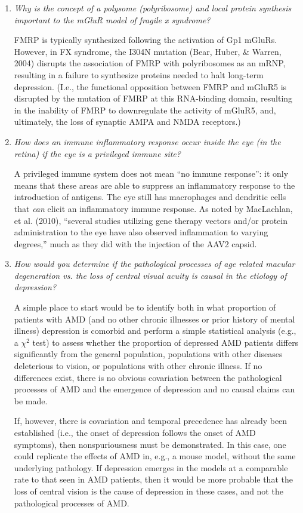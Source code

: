 \documentclass[11pt,final] {article}
\begin{document}
\begin{enumerate}
	\item \textit{Why is the concept of a polysome (polyribosome) and local protein synthesis important to the mGluR model of fragile x syndrome?}
	
	FMRP is typically synthesized following the activation of Gp1 mGluRs. However, in FX syndrome, the I304N mutation (Bear, Huber, \& Warren, 2004) disrupts the association of FMRP with polyribosomes as an mRNP, resulting in a failure to synthesize proteins needed to halt long-term depression. (I.e., the functional opposition between FMRP and mGluR5 is disrupted by the mutation of FMRP at this RNA-binding domain, resulting in the inability of FMRP to downregulate the activity of mGluR5, and, ultimately, the loss of synaptic AMPA and NMDA receptors.)

	\item \textit{How does an immune inflammatory response occur inside the eye (in the retina) if the eye is a privileged immune site?}
	
	A privileged immune system does not mean ``no immune response'': it only means that these areas are able to suppress an inflammatory response to the introduction of antigens. The eye still has macrophages and dendritic cells that \textit{can} elicit an inflammatory immune response. As noted by MacLachlan, et al. (2010), ``several studies utilizing gene therapy vectors and/or protein administration to the eye have also observed inflammation to varying degrees,'' much as they did with the injection of the AAV2 capsid.

	\item \textit{How would you determine if the pathological processes of age related macular degeneration vs. the loss of central visual acuity is causal in the etiology of depression?}
	
	A simple place to start would be to identify both in what proportion of patients with AMD (and no other chronic illnesses or prior history of mental illness) depression is comorbid and perform a simple statistical analysis (e.g., a $\chi ^2$ test) to assess whether the proportion of depressed AMD patients differs significantly from the general population, populations with other diseases deleterious to vision, or populations with other chronic illness. If no differences exist, there is no obvious covariation between the pathological processes of AMD and the emergence of depression and no causal claims can be made.
	
	If, however, there is covariation and temporal precedence has already been established (i.e., the onset of depression follows the onset of AMD symptoms), then nonspuriousness must be demonstrated. In this case, one could replicate the effects of AMD in, e.g., a mouse model, without the same underlying pathology. If depression emerges in the models at a comparable rate to that seen in AMD patients, then it would be more probable that the loss of central vision is the cause of depression in these cases, and not the pathological processes of AMD.


\end{enumerate}
\end{document}
